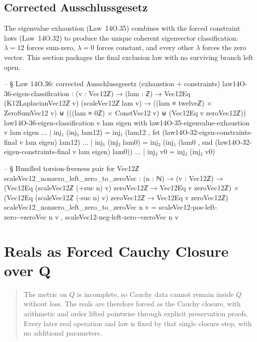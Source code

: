\documentclass[11pt,a4paper]{book}
\def\mathbb#1{#1}%
\def\texorpdfstring#1#2{#2}%
\begin{document}
\section{Corrected Ausschlussgesetz}

The eigenvalue exhaustion (Law~14O.35) combines with the forced
constraint laws (Law~14O.32) to produce the unique coherent
eigenvector classification: $\lambda=12$ forces sum-zero,
$\lambda=0$ forces constant, and every other $\lambda$ forces
the zero vector.  This section packages the final exclusion law with no
surviving branch left open.

\begin{code}
-- § Law 14O.36: corrected Ausschlussgesetz (exhaustion + constraints)
law14O-36-eigen-classification : (v : Vec12ℤ) → (lam : ℤ) →
  Vec12Eq (K12LaplacianVec12ℤ v) (scaleVec12ℤ lam v) →
  ((lam ≡ twelveℤ) × ZeroSumVec12 v) ⊎ (((lam ≡ 0ℤ) × ConstVec12 v) ⊎ (Vec12Eq v zeroVec12ℤ))
law14O-36-eigen-classification v lam eigen with law14O-35-eigenvalue-exhaustion v lam eigen
... | inj₁ (inj₁ lam12) =
  inj₁ (lam12 , fst (law14O-32-eigen-constraints-final v lam eigen) lam12)
... | inj₁ (inj₂ lam0) =
  inj₂ (inj₁ (lam0 , snd (law14O-32-eigen-constraints-final v lam eigen) lam0))
... | inj₂ v0 =
  inj₂ (inj₂ v0)

-- § Bundled torsion-freeness pair for Vec12ℤ
scaleVec12_nonzero_left_zero_to_zeroVec :
  (n : ℕ) → (v : Vec12ℤ) →
  (Vec12Eq (scaleVec12ℤ (+suc n) v) zeroVec12ℤ → Vec12Eq v zeroVec12ℤ)
  × (Vec12Eq (scaleVec12ℤ (-suc n) v) zeroVec12ℤ → Vec12Eq v zeroVec12ℤ)
scaleVec12_nonzero_left_zero_to_zeroVec n v =
  scaleVec12-pos-left-zero→zeroVec n v , scaleVec12-neg-left-zero→zeroVec n v
\end{code}


\chapter{Reals as Forced Cauchy Closure over \texorpdfstring{$\mathbb{Q}$}{Q}}
\label{ch:reals-cauchy}

\begin{quote}
The metric on $\mathbb{Q}$ is incomplete, so Cauchy data cannot remain inside
$\mathbb{Q}$ without loss.  The reals are therefore forced as the Cauchy
closure, with arithmetic and order lifted pointwise through explicit
preservation proofs.  Every later real operation and law is fixed by that
single closure step, with no additional parameters.
\end{quote}
\end{document}
